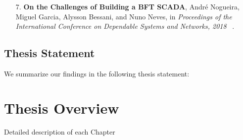 \begin{enumerate}

\item[7.] \textbf{On the Challenges of Building a BFT SCADA}, Andr\'{e} Nogueira, Miguel Garcia, Alysson Bessani, and Nuno Neves, in \emph{Proceedings of the International Conference on Dependable Systems and Networks, 2018 }~\cite{Nogueira:2018}.
\end{enumerate}


\subsection{Thesis Statement}
We summarize our findings in the following thesis statement:

\vspace{2mm}





\section{Thesis Overview}
Detailed description of each Chapter
